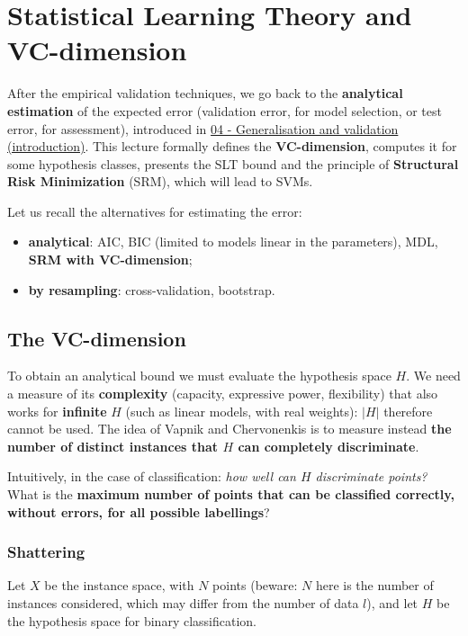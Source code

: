 \chapter{Statistical Learning Theory and VC-dimension}\label{ch-12}

After the empirical validation techniques, we go back to the
\textbf{analytical estimation} of the expected error (validation error,
for model selection, or test error, for assessment), introduced in
\href{04\%20-\%20Generalizzazione\%20e\%20validazione\%20(introduzione)}{04
- Generalisation and validation (introduction)}. This lecture formally
defines the \textbf{VC-dimension}, computes it for some hypothesis
classes, presents the SLT bound and the principle of \textbf{Structural
Risk Minimization} (SRM), which will lead to SVMs.

Let us recall the alternatives for estimating the error:

\begin{itemize}
\tightlist
\item
  \textbf{analytical}: AIC, BIC (limited to models linear in the
  parameters), MDL, \textbf{SRM with VC-dimension};
\item
  \textbf{by resampling}: cross-validation, bootstrap.
\end{itemize}

\section{The VC-dimension}\label{la-vc-dimension}

To obtain an analytical bound we must evaluate the hypothesis space
\(H\). We need a measure of its \textbf{complexity} (capacity,
expressive power, flexibility) that also works for \textbf{infinite}
\(H\) (such as linear models, with real weights): \(|H|\) therefore
cannot be used. The idea of Vapnik and Chervonenkis is to measure
instead \textbf{the number of distinct instances that \(H\) can
completely discriminate}.

Intuitively, in the case of classification: \emph{how well can \(H\)
discriminate points?} What is the \textbf{maximum number of points that
can be classified correctly, without errors, for all possible
labellings}?

\subsection{Shattering}\label{shattering}

Let \(X\) be the instance space, with \(N\) points (beware: \(N\) here
is the number of instances considered, which may differ from the number
of data \(l\)), and let \(H\) be the hypothesis space for binary
classification.

